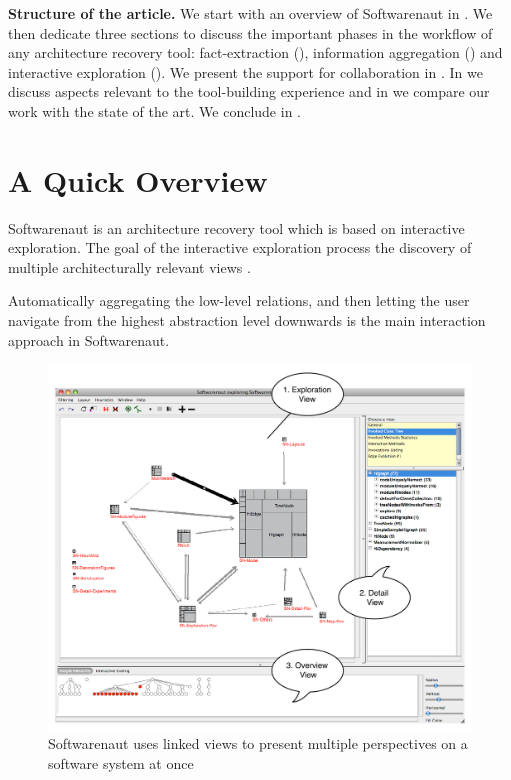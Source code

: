\documentclass[preprint,12pt]{elsarticle}
\begin{document}
{\footnotesize 
{\bf Structure of the article.} We start with an overview of Softwarenaut in . We then dedicate three sections to discuss the important phases in the workflow of any architecture recovery tool: fact-extraction (), information aggregation () and interactive exploration (). We present the support for collaboration in . In  we discuss aspects relevant to the tool-building experience and in  we compare our work with the state of the art. We conclude in .
}


\newpage
\section {A Quick Overview}
\label{sec:over}

Softwarenaut is an architecture recovery tool which is based on interactive exploration. The goal of the interactive exploration process the discovery of multiple architecturally relevant views \cite{lungu-packages}.

Automatically aggregating the low-level relations, and then letting the user navigate from the highest abstraction level downwards is the main interaction approach in Softwarenaut. 

\begin{figure}[h]
\begin{center}
\includegraphics[width=0.9\linewidth]{SnautOnSnaut.pdf}
\caption{Softwarenaut uses linked views to present multiple perspectives on a software system at once}
\end{center}
\end{figure}
\end{document}
